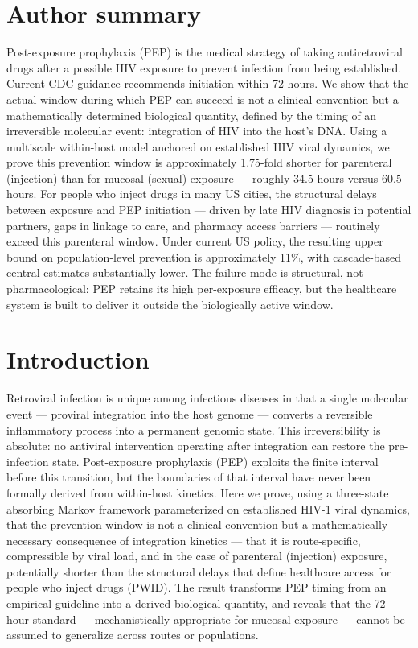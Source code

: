\documentclass[10pt,letterpaper]{article}
\theoremstyle{definition}
\theoremstyle{remark}
\begin{document}
\section*{Author summary}
Post-exposure prophylaxis (PEP) is the medical strategy of taking antiretroviral drugs after a possible HIV exposure to prevent infection from being established. Current CDC guidance recommends initiation within 72 hours. We show that the actual window during which PEP can succeed is not a clinical convention but a mathematically determined biological quantity, defined by the timing of an irreversible molecular event: integration of HIV into the host's DNA. Using a multiscale within-host model anchored on established HIV viral dynamics, we prove this prevention window is approximately 1.75-fold shorter for parenteral (injection) than for mucosal (sexual) exposure --- roughly 34.5 hours versus 60.5 hours. For people who inject drugs in many US cities, the structural delays between exposure and PEP initiation --- driven by late HIV diagnosis in potential partners, gaps in linkage to care, and pharmacy access barriers --- routinely exceed this parenteral window. Under current US policy, the resulting upper bound on population-level prevention is approximately 11\%, with cascade-based central estimates substantially lower. The failure mode is structural, not pharmacological: PEP retains its high per-exposure efficacy, but the healthcare system is built to deliver it outside the biologically active window.


\section*{Introduction}

Retroviral infection is unique among infectious diseases in that a single molecular event --- proviral integration into the host genome --- converts a reversible inflammatory process into a permanent genomic state. This irreversibility is absolute: no antiviral intervention operating after integration can restore the pre-infection state. Post-exposure prophylaxis (PEP) exploits the finite interval before this transition, but the boundaries of that interval have never been formally derived from within-host kinetics. Here we prove, using a three-state absorbing Markov framework parameterized on established HIV-1 viral dynamics\cite{tanner2025,chun1995,siliciano2005}, that the prevention window is not a clinical convention but a mathematically necessary consequence of integration kinetics --- that it is route-specific, compressible by viral load, and in the case of parenteral (injection) exposure, potentially shorter than the structural delays that define healthcare access for people who inject drugs (PWID). The result transforms PEP timing from an empirical guideline into a derived biological quantity, and reveals that the 72-hour standard --- mechanistically appropriate for mucosal exposure --- cannot be assumed to generalize across routes or populations.
\end{document}
